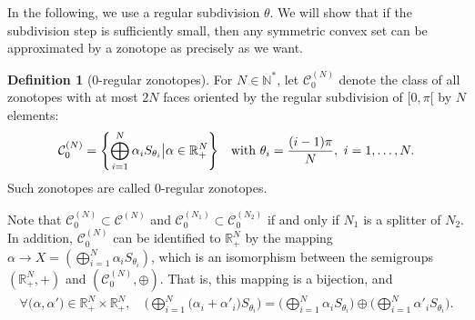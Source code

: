 \documentclass[numbers,compress,v1.0.1]{vmsta}
\theoremstyle{definition}
\newtheorem{definition}{Definition}
\begin{document}
In the following, we use a regular subdivision $\theta$. We will show
that if the subdivision step is sufficiently small, then any symmetric
convex set can be approximated by a zonotope as precisely as we want.

\begin{definition}[$0$-regular zonotopes]
For $N\in\mathbb{N}^*$, let $\mathcal{C}^{(N)}_0$ denote the class of
all zonotopes with at most $2N$ faces oriented by the regular
subdivision of $[0,\pi[$ by $N$ elements:
%
\begin{equation*}
\mathcal{C}^{(N)}_0=\Biggl\lbrace\bigoplus
_{i=1}^N \alpha_i S_{\theta
_i}\big\vert
\alpha\in\mathbb{R}_+ ^N\Biggr\rbrace\text{\quad with }
\theta_i=\frac
{(i-1)\pi}{N}, \ i=1,\dots,N.
\end{equation*}
%
Such zonotopes are called $0$-regular zonotopes.
\end{definition}
%
Note that $\mathcal{C}^{(N)}_0\subset\mathcal{C}^{(N)}$ and $\mathcal
{C}^{(N_1)}_0\subset\mathcal{C}^{(N_2)}_0 $ if and only if $N_1$ is a
splitter of $N_2$. In addition, $\mathcal{C}^{(N)}_0$ can be identified
to $\mathbb{R}_+ ^N $ by the mapping $\alpha\rightarrow X=(\bigoplus_{i=1}^N \alpha_i S_{\theta_i}) $, which is an isomorphism between the
semigroups $(\mathbb{R}_+ ^N , +)$ and $(\mathcal{C}^{(N)}_0, \oplus)$.
That is, this mapping is a bijection, and
%
\begin{align*}
\forall\bigl(\alpha,\alpha'\bigr)\in\mathbb{R}_+ ^N
\times\mathbb{R}_+ ^N, \quad  \Biggl(\bigoplus
_{i=1}^N \bigl(\alpha_i+
\alpha'_i\bigr) S_{\theta_i}\Biggr)=\Biggl(\bigoplus
_{i=1}^N \alpha_i
S_{\theta_i}\Biggr)\oplus\Biggl(\bigoplus_{i=1}^N
\alpha'_i S_{\theta_i}\Biggr).
\end{align*}
\end{document}
